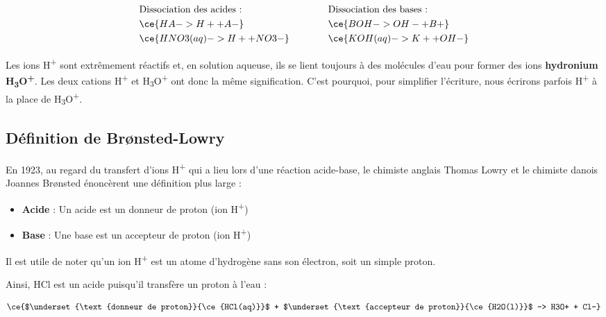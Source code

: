 \documentclass[
  11pt,
  a4paper,
  openany]{book}
\providecommand{\tightlist}{%
  \setlength{\itemsep}{0pt}\setlength{\parskip}{0pt}}
\begin{document}
\[
\begin{split}
& \text{Dissociation des acides :} \\
& \ce{HA -> H+ + A-} \\
& \ce{HNO3(aq) -> H+ + NO3-}
\end{split}
\qquad\qquad
\begin{split}
& \text{Dissociation des bases :} \\
& \ce{BOH -> OH- + B+} \\
& \ce{KOH(aq) -> K+ + OH-}
\end{split}
\]

Les ions H\textsuperscript{+} sont extrêmement réactifs et, en solution aqueuse, ils se lient toujours à des molécules d'eau pour former des ions \textbf{hydronium H\textsubscript{3}O\textsuperscript{+}}. Les deux cations H\textsuperscript{+} et H\textsubscript{3}O\textsuperscript{+} ont donc la même signification. C'est pourquoi, pour simplifier l'écriture, nous écrirons parfois H\textsuperscript{+} à la place de H\textsubscript{3}O\textsuperscript{+}.

\clearpage

\hypertarget{duxe9finition-de-bruxf8nsted-lowry}{%
\subsection{Définition de Brønsted-Lowry}\label{duxe9finition-de-bruxf8nsted-lowry}}

En 1923, au regard du transfert d'ions H\textsuperscript{+} qui a lieu lors d'une réaction acide-base, le chimiste anglais Thomas Lowry et le chimiste danois Joannes Brønsted énoncèrent une définition plus large :

\begin{itemize}
\tightlist
\item
  \textbf{Acide} : Un acide est un donneur de proton (ion H\textsuperscript{+})
\item
  \textbf{Base} : Une base est un accepteur de proton (ion H\textsuperscript{+})
\end{itemize}

Il est utile de noter qu'un ion H\textsuperscript{+} est un atome d'hydrogène sans son électron, soit un simple proton.

Ainsi, HCl est un acide puisqu'il transfère un proton à l'eau :

\[
\ce{$\underset{\text{donneur de proton}}{\ce{HCl(aq)}}$ + $\underset{\text{accepteur de proton}}{\ce{H2O(l)}}$ -> H3O+ + Cl-}
\]
\end{document}
